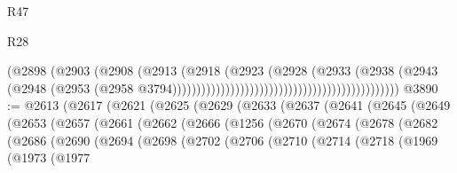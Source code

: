 \begin{lexlean}{R47}
\begin{lexlean}{R28}
\begin{coremodule}
{{{{{{{{{{{{{{{{{{{{{{{{{{{{{{{{{{{{{{{{{{{{{{{{{{{{{{{{{{{{{{{{{{{{{{{{{{{{{{{{{{{{{{{{{{{{{{{{{{{{{{{{{{{{{{{{{{{{{{{{{{{{{{{{{{{{{                                                                        (@2898
                                                                          (@2903
                                                                            (@2908
                                                                              (@2913
                                                                                (@2918
                                                                                  (@2923
                                                                                    (@2928
                                                                                      (@2933
                                                                                        (@2938
                                                                                          (@2943
                                                                                            (@2948
                                                                                              (@2953
                                                                                                (@2958
                                                                                                  @3794)))))))))))))))))))))))))))))))))))))))))))))))
@3890 := @2613
    (@2617
      (@2621
        (@2625
          (@2629
            (@2633
              (@2637
                (@2641
                  (@2645
                    (@2649
                      (@2653
                        (@2657
                          (@2661
                            (@2662
                              (@2666
                                (@1256
                                  (@2670
                                    (@2674
                                      (@2678
                                        (@2682
                                          (@2686
                                            (@2690
                                              (@2694
                                                (@2698
                                                  (@2702
                                                    (@2706
                                                      (@2710
                                                        (@2714
                                                          (@2718
                                                            (@1969
                                                              (@1973
                                                                (@1977
}}}}}}}}}}}}}}}}}}}}}}}}}}}}}}}}}}}}}}}}}}}}}}}}}}}}}}}}}}}}}}}}}}}}}}}}}}}}}}}}}}}}}}}}}}}}}}}}}}}}}}}}}}}}}}}}}}}}}}}}}}}}}}}}}}}}}
\end{coremodule}
\end{lexlean}
\end{lexlean}
